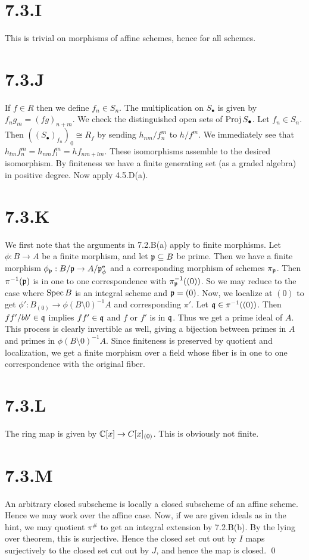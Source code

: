 \documentclass{article}
\begin{document}
\section{7.3.I}
This is trivial on morphisms of affine schemes, hence for all schemes.

\section{7.3.J}
If $f \in R$ then we define $f_n \in S_n$. The
multiplication on $S_{\bullet}$ is given by $f_ng_m=(fg)_{n+m}$.
We check the distinguished open sets of $\operatorname{Proj}
    S_{\bullet}$. Let
$f_n \in S_n$. Then $((S_{\bullet})_{f_n})_0
    \cong R_f$ by sending
$h_{nm}/f_n^m$ to $h/f^m$. We immediately see that
$h_{lm}f_n^m=h_{nm}f_l^m=hf_{nm+lm}$. These isomorphisms assemble to the desired
isomorphism. By finiteness we have a finite generating set (as a graded
algebra) in positive degree. Now apply 4.5.D(a).

\section{7.3.K}
We first note that the arguments in 7.2.B(a) apply to finite morphisms. Let
$\phi: B \to A$ be a finite morphism, and let $\mathfrak{p} \subseteq B$
be prime. Then we have a finite morphism $\phi_{\mathfrak{p}}: B/\mathfrak{p} \to A/\mathfrak{p}^{\text{e}}_\phi$ and a
corresponding morphism of schemes $\pi_{\mathfrak{p}}$. Then
$\pi^{-1}(\mathfrak{p})$ is in one to one correspondence with
$\pi_{\mathfrak{p}}^{-1}((0))$. So we may reduce to the case where
$\operatorname{Spec} B$ is an integral scheme and $\mathfrak{p}=(0)$. Now,
we localize at $(0)$ to get $\phi': B_{(0)} \to \phi(B\setminus 0)^{-1}A$ and
corresponding $\pi'$. Let $\mathfrak{q} \in \pi^{-1}((0))$. Then
$ff'/bb' \in \mathfrak{q}$ implies $ff' \in \mathfrak{q}$ and
$f$ or $f'$ is in
$\mathfrak{q}$. Thus we get a prime ideal of $A$.
This process is clearly invertible as well, giving a bijection between primes
in $A$ and primes in $\phi(B\setminus 0)^{-1}A$. Since
finiteness is preserved by quotient and localization, we get a finite morphism
over a field whose fiber is in one to one correspondence with the original
fiber.

\section{7.3.L}
The ring map is given by $\mathbb{C}[x] \to C[x]_{(0)}$. This is obviously not finite.

\section{7.3.M}
An arbitrary closed subscheme is locally a closed subscheme of an affine
scheme. Hence we may work over the affine case. Now, if we are given ideals as
in the hint, we may quotient $\pi^{\#}$ to get an integral
extension by 7.2.B(b). By the lying over theorem, this is surjective. Hence the
closed set cut out by $I$ maps surjectively to the closed
set cut out by $J$, and hence the map is closed. \qed
\end{document}
